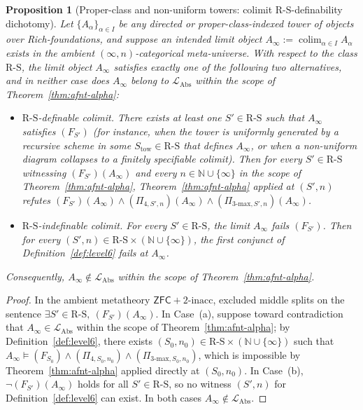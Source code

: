 \documentclass[11pt]{article}
\theoremstyle{plain}
\newtheorem{proposition}[theorem]{Proposition}
\theoremstyle{definition}
\newcommand{\RS}{\mathrm{R\text{-}S}}
\newcommand{\LAbs}{\mathcal{L}_{\mathrm{Abs}}}
\newcommand{\ZFC}{\mathsf{ZFC}}
\DeclareMathOperator{\colim}{colim}
\begin{document}
\begin{proposition}[Proper-class and non-uniform towers: colimit $\RS$-definability dichotomy]\label{prop:proper-class}
Let $\{A_\alpha\}_{\alpha \in I}$ be any directed or proper-class-indexed tower of objects over Rich-foundations, and suppose an intended limit object $A_\infty := \colim_{\alpha \in I} A_\alpha$ exists in the ambient $(\infty, n)$-categorical meta-universe. With respect to the class $\RS$, the limit object $A_\infty$ satisfies exactly one of the following two alternatives, and in neither case does $A_\infty$ belong to $\LAbs$ within the scope of Theorem~\ref{thm:afnt-alpha}:
\begin{itemize}
\item[\textbf{(a)}] \emph{$\RS$-definable colimit.} There exists at least one $S' \in \RS$ such that $A_\infty$ satisfies $(F_{S'})$ (for instance, when the tower is uniformly generated by a recursive scheme in some $S_{\mathrm{tow}} \in \RS$ that defines $A_\infty$, or when a non-uniform diagram collapses to a finitely specifiable colimit). Then for every $S' \in \RS$ witnessing $(F_{S'})(A_\infty)$ and every $n \in \mathbb{N} \cup \{\infty\}$ in the scope of Theorem~\ref{thm:afnt-alpha}, Theorem~\ref{thm:afnt-alpha} applied at $(S', n)$ refutes $(F_{S'})(A_\infty) \wedge (\Pi_{4, S', n})(A_\infty) \wedge (\Pi_{3\text{-max}, S', n})(A_\infty)$.
\item[\textbf{(b)}] \emph{$\RS$-indefinable colimit.} For every $S' \in \RS$, the limit $A_\infty$ fails $(F_{S'})$. Then for every $(S', n) \in \RS \times (\mathbb{N} \cup \{\infty\})$, the first conjunct of Definition~\ref{def:level6} fails at $A_\infty$.
\end{itemize}
Consequently, $A_\infty \notin \LAbs$ within the scope of Theorem~\ref{thm:afnt-alpha}.
\end{proposition}

\begin{proof}
In the ambient metatheory $\ZFC + 2\text{-inacc}$, excluded middle splits on the sentence $\exists S' \in \RS,\ (F_{S'})(A_\infty)$. In Case~(a), suppose toward contradiction that $A_\infty \in \LAbs$ within the scope of Theorem~\ref{thm:afnt-alpha}; by Definition~\ref{def:level6}, there exists $(S_0, n_0) \in \RS \times (\mathbb{N} \cup \{\infty\})$ such that $A_\infty \models (F_{S_0}) \wedge (\Pi_{4, S_0, n_0}) \wedge (\Pi_{3\text{-max}, S_0, n_0})$, which is impossible by Theorem~\ref{thm:afnt-alpha} applied directly at $(S_0, n_0)$. In Case~(b), $\neg(F_{S'})(A_\infty)$ holds for all $S' \in \RS$, so no witness $(S', n)$ for Definition~\ref{def:level6} can exist. In both cases $A_\infty \notin \LAbs$.
\end{proof}
\end{document}
